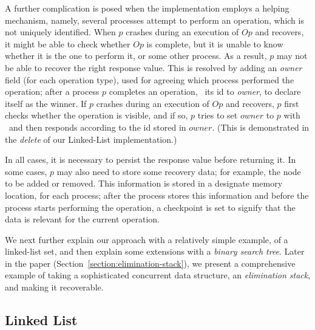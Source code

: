 A further complication is posed when the implementation employs a helping
mechanism, namely, several processes attempt to perform an operation,
which is not uniquely identified.
When $p$ crashes during an execution of $Op$ and recovers, it might be
able to check whether $Op$ is complete, but it is unable to
know whether it is the one to perform it, or some other process.
As a result, $p$ may not be able to recover the right response value.
This is resolved by adding an \emph{owner} field (for each operation type),
used for agreeing which process performed the operation;
after a process $p$ completes an operation, \CAS\ its id to \emph{owner},
to declare itself as the winner.
If $p$ crashes during an execution of $Op$ and recovers,
$p$ first checks whether the operation is visible, and if so,
$p$ tries to set $owner$ to $p$ with \CAS\ and then responds according to
the id stored in $owner$.
(This is demonstrated in the \emph{delete} of our Linked-List implementation.)

In all cases, it is necessary to persist the response value before returning it.
In some cases, $p$ may also need to store some recovery data;
for example, the node to be added or removed.
This information is stored in a designate memory location, for each process;
after the process stores this information and before the process starts
performing the operation,
a checkpoint is set to signify that the data is relevant for the current operation.

We next further explain our approach with a relatively simple example,
of a linked-list set, and then explain some extensions with a
\emph{binary search tree}.
Later in the paper (Section~\ref{section:elimination-stack}),
we present a comprehensive example
of taking a sophisticated concurrent data structure,
an \emph{elimination stack}, and making it recoverable.

\subsection*{Linked List}

